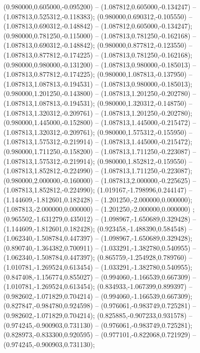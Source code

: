  (0.980000,0.605000,-0.095200) -- (1.087812,0.605000,-0.134247) -- (1.087813,0.525312,-0.118383);
 (0.980000,0.690312,-0.105550) -- (1.087813,0.690312,-0.148842) -- (1.087812,0.605000,-0.134247);
 (0.980000,0.781250,-0.115000) -- (1.087813,0.781250,-0.162168) -- (1.087813,0.690312,-0.148842);
 (0.980000,0.877812,-0.123550) -- (1.087813,0.877812,-0.174225) -- (1.087813,0.781250,-0.162168);
 (0.980000,0.980000,-0.131200) -- (1.087813,0.980000,-0.185013) -- (1.087813,0.877812,-0.174225);
 (0.980000,1.087813,-0.137950) -- (1.087813,1.087813,-0.194531) -- (1.087813,0.980000,-0.185013);
 (0.980000,1.201250,-0.143800) -- (1.087813,1.201250,-0.202780) -- (1.087813,1.087813,-0.194531);
 (0.980000,1.320312,-0.148750) -- (1.087813,1.320312,-0.209761) -- (1.087813,1.201250,-0.202780);
 (0.980000,1.445000,-0.152800) -- (1.087813,1.445000,-0.215472) -- (1.087813,1.320312,-0.209761);
 (0.980000,1.575312,-0.155950) -- (1.087813,1.575312,-0.219914) -- (1.087813,1.445000,-0.215472);
 (0.980000,1.711250,-0.158200) -- (1.087813,1.711250,-0.223087) -- (1.087813,1.575312,-0.219914);
 (0.980000,1.852812,-0.159550) -- (1.087813,1.852812,-0.224990) -- (1.087813,1.711250,-0.223087);
 (0.980000,2.000000,-0.160000) -- (1.087813,2.000000,-0.225625) -- (1.087813,1.852812,-0.224990);
 (1.019167,-1.798996,0.244147) -- (1.144609,-1.812601,0.182428) -- (1.201250,-2.000000,0.000000);
 (1.087813,-2.000000,0.000000) -- (1.201250,-2.000000,0.000000) ;
 (0.965502,-1.631279,0.435012) -- (1.098967,-1.650689,0.329428) -- (1.144609,-1.812601,0.182428);
 (0.923458,-1.488390,0.584548) -- (1.062340,-1.508784,0.447397) -- (1.098967,-1.650689,0.329428);
 (0.890740,-1.364382,0.700911) -- (1.033291,-1.382780,0.540955) -- (1.062340,-1.508784,0.447397);
 (0.865759,-1.254928,0.789760) -- (1.010781,-1.269524,0.613454) -- (1.033291,-1.382780,0.540955);
 (0.847408,-1.156774,0.855027) -- (0.994060,-1.166539,0.667309) -- (1.010781,-1.269524,0.613454);
 (0.834933,-1.067399,0.899397) -- (0.982602,-1.071829,0.704214) -- (0.994060,-1.166539,0.667309);
 (0.827847,-0.984780,0.924598) -- (0.976061,-0.983749,0.725281) -- (0.982602,-1.071829,0.704214);
 (0.825885,-0.907233,0.931578) -- (0.974245,-0.900903,0.731130) -- (0.976061,-0.983749,0.725281);
 (0.828973,-0.833300,0.920595) -- (0.977101,-0.822068,0.721929) -- (0.974245,-0.900903,0.731130);

